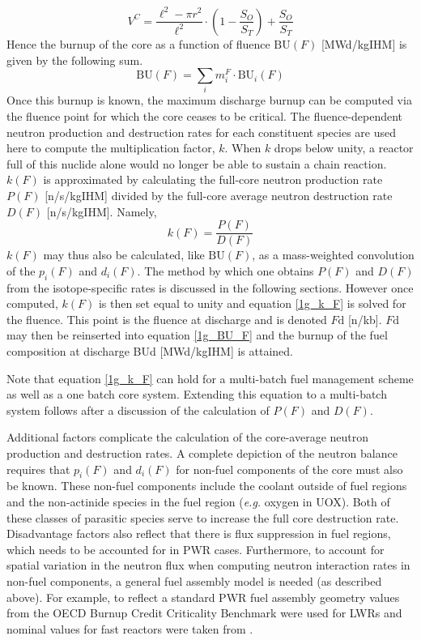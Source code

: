 \begin{equation}
\label{1g_VC}
V^C = \frac{\ell^2 - \pi r^2}{\ell^2} \cdot \left(1 - \frac{S_O}{S_T}\right) + \frac{S_O}{S_T}
\end{equation}
Hence the burnup of the core as a function of fluence $\mbox{BU}(F)$ [MWd/kgIHM] is given by 
the following sum.
\begin{equation}
\label{1g_BU_F}
\mbox{BU}(F) = \sum_i m_i^F \cdot \mbox{BU}_i(F)
\end{equation}
Once this burnup is known, the maximum discharge burnup can be computed via the fluence point 
for which the core ceases to be critical.  The fluence-dependent neutron production and destruction 
rates for each constituent species are used here to compute the multiplication factor, $k$.    When $k$ drops 
below unity, a reactor full of this nuclide alone would no longer be able to sustain a chain reaction.  $k(F)$ is 
approximated by calculating the full-core neutron production rate $P(F)$ [n/s/kgIHM] divided by the 
full-core average neutron destruction rate $D(F)$ [n/s/kgIHM].  Namely,
\begin{equation}
\label{1g_k_F}
k(F) = \frac{P(F)}{D(F)}
\end{equation}
$k(F)$ may thus also be calculated, like $\mbox{BU}(F)$, as a mass-weighted convolution of the $p_i(F)$ and 
$d_i(F)$.  The method by which one obtains $P(F)$ and $D(F)$ from the isotope-specific rates is discussed 
in the following sections.  However once computed, $k(F)$ is then set equal to unity and equation \ref{1g_k_F} 
is solved for the fluence.  This point is the fluence at discharge and is denoted $F\mbox{d}$ [n/kb].  
$F\mbox{d}$ may then be reinserted into equation \ref{1g_BU_F} and the burnup of the fuel composition at discharge 
BUd [MWd/kgIHM] is attained.

Note that equation \ref{1g_k_F} can hold for a multi-batch fuel management scheme as well as a one batch core 
system.  Extending this equation to a multi-batch system follows after a discussion of the calculation of 
$P(F)$ and $D(F)$.

Additional factors complicate the calculation of the core-average neutron production and destruction rates.  
A complete depiction of the neutron balance requires that $p_i(F)$ and $d_i(F)$ for non-fuel components of 
the core must also be known.  These non-fuel components include the coolant outside of fuel regions and the 
non-actinide species in the fuel region (\emph{e.g.} oxygen in UOX).  Both of these classes of parasitic 
species serve to increase the full core destruction rate.  Disadvantage factors also reflect that there is flux 
suppression in fuel regions, which needs to be accounted for in PWR cases.  Furthermore, to 
account for spatial variation in the neutron flux when computing neutron interaction rates in non-fuel 
components, a general fuel assembly model is needed (as described above).  For example, to reflect a 
standard PWR fuel assembly geometry values from the OECD Burnup Credit Criticality Benchmark \cite{Takano1994} 
were used for LWRs and nominal values for fast reactors were taken from \cite{INL/CON-07-12478}.  

